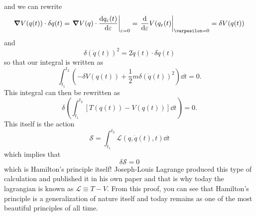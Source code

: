\documentclass[11pt]{scrartcl}
\begin{document}
and we can rewrite 
\[\grad V (q(t)) \cdot \delta q(t) = \left.\grad V(q) \cdot \dv{q_{\varepsilon}(t)}{\varepsilon}\right|_{\varepsilon = 0} = \left.\dv{}{\varepsilon}V(q_{\varepsilon} (t)\right|_{\varpesilon = 0} = \delta V(q(t))\]
and 
\[\delta (\dot{q} (t))^2 = 2\dot{q} (t) \cdot \delta \dot{q} (t)\]
so that our integral is written as 
\[\int_{t_1}^{t_2} \left(-\delta V(q(t)) + \frac{1}{2}m\delta (\dot{q}(t))^2\right)\dd t = 0.\]
This integral can then be rewritten as 
\[\delta \left(\int_{t_1}^{t_2}[T(q(t)) - V(q(t))]\dd t\right) = 0.\]
This itself is the action 
\[\mathcal{S} = \int_{t_1}^{t_2} \mathcal{L} (q, \dot{q} (t), t) \dd t\]
which implies that 
\[\delta \mathcal{S} = 0\]
which is Hamilton's principle itself! Joseph-Louis Lagrange produced this type of calculation and published it in his own paper and that is why today the lagrangian is known as $\mathcal{L} \equiv T - V$. From this proof, you can see that Hamilton's principle is a generalization of nature itself and today remains as one of the most beautiful principles of all time. 
\end{document}
